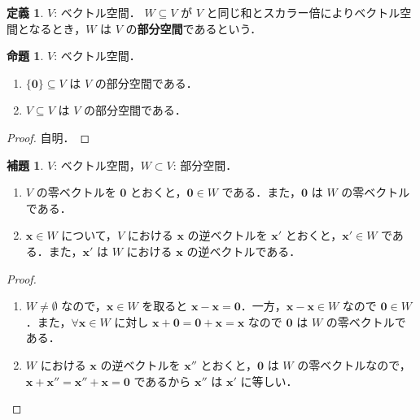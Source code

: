 \documentclass{jlreq}
\theoremstyle{definition}
\newtheorem{dfn}[thm]{定義}
\newtheorem{prop}[thm]{命題}
\newtheorem{lem}[thm]{補題}
\begin{document}
      \begin{dfn}
        $V$: ベクトル空間．
        $W \subseteq V$ が $V$ と同じ和とスカラー倍によりベクトル空間となるとき，$W$ は $V$ の\textbf{部分空間}であるという．
      \end{dfn}
      \begin{prop}
        $V$: ベクトル空間．
        \begin{enumerate}
          \item $\{\bm{0}\} \subseteq V$ は $V$ の部分空間である．
          \item $V \subseteq V$ は $V$ の部分空間である．
        \end{enumerate}
      \end{prop}
      \begin{proof}
        \mbox{}
        自明．
      \end{proof}
      \begin{lem}\label{zero-vector-and-inverse-are-in-subspace}
        $V$: ベクトル空間，$W \subset V$: 部分空間．
        \begin{enumerate}
          \item $V$ の零ベクトルを $\bm{0}$ とおくと，$\bm{0} \in W$ である．また，$\bm{0}$ は $W$ の零ベクトルである．
          \item $\bm{x} \in W$ について，$V$ における $\bm{x}$ の逆ベクトルを $\bm{x}'$ とおくと，$\bm{x}' \in W$ である．また，$\bm{x}'$ は $W$ における $\bm{x}$ の逆ベクトルである．
        \end{enumerate}
      \end{lem}
      \begin{proof}
        \mbox{}
        \begin{enumerate}
          \item $W \neq \emptyset$ なので，$\bm{x} \in W$ を取ると $\bm{x}-\bm{x}=\bm{0}$．一方，$\bm{x}-\bm{x} \in W$ なので $\bm{0} \in W$．また，$\forall \bm{x} \in W$ に対し $\bm{x}+\bm{0}=\bm{0}+\bm{x}=\bm{x}$ なので $\bm{0}$ は $W$ の零ベクトルである．
          \item $W$ における $\bm{x}$ の逆ベクトルを $\bm{x}''$ とおくと，$\bm{0}$ は $W$ の零ベクトルなので，$\bm{x}+\bm{x}''=\bm{x}''+\bm{x}=\bm{0}$ であるから $\bm{x}''$ は $\bm{x}'$ に等しい．
        \end{enumerate}
      \end{proof}
\end{document}
